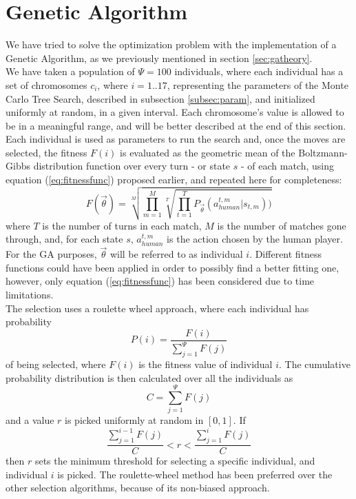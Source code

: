 \section{Genetic Algorithm}\label{sec:ga}
We have tried to solve the optimization problem with the implementation of a Genetic Algorithm, as we previously mentioned in section \ref{sec:gatheory}. \\
We have taken a population of $\Psi=100$ individuals, where each individual has a set of chromosomes $c_i$, where $i=1..17$, representing the parameters of the Monte Carlo Tree Search, described in subsection \ref{subsec:param}, and initialized uniformly at random, in a given interval. Each chromosome's value is allowed to be in a meaningful range, and will be  better described at the end of this section.\\
Each individual is used as parameters to run the search and, once the moves are selected, the fitness $F(i)$ is evaluated as the geometric mean of the Boltzmann-Gibbs distribution function over every turn - or state $s$ - of each match, using equation (\ref{eq:fitnessfunc}) proposed earlier, and repeated here for completeness:
\begin{equation*}
F(\vec{\theta}) = \sqrt[M]{\prod_{m=1}^{M}\sqrt[T]{\prod_{t=1}^{T}P_{\vec{\theta}}(a_{human}^{t,m}|s_{t,m}))}}
\end{equation*} where $T$ is the number of turns in each match, $M$ is the number of matches gone through, and, for each state $s$, $a_{human}^{t,m}$ is the action chosen by the human player. For the GA purposes, $\vec{\theta}$ will be referred to as individual $i$.
Different fitness functions could have been applied in order to possibly find a better fitting one, however, only equation (\ref{eq:fitnessfunc}) has been considered due to time limitations.\\
The selection uses a roulette wheel approach, where each individual has probability $$P(i) =\frac{F(i)}{\sum_{j=1}^{\Psi}F(j)}$$ of being selected, where $F(i)$ is the fitness value of individual $i$. The cumulative probability distribution is then calculated over all the individuals as $$C=\sum^\Psi_{j=1}F(j)$$ and a value $r$ is picked uniformly at random in $[0,1]$. If $$\frac{\sum^{i-1}_{j=1} F(j)}{C}< r < \frac{\sum^{i}_{j=1}F(j)}{C}$$ then $r$ sets the minimum threshold for selecting a specific individual, and individual $i$ is picked. The roulette-wheel method has been preferred over the other selection algorithms, because of its non-biased approach\cite{chipperfield1997introduction}.\\
